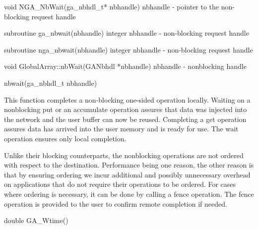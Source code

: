 \documentclass[12pt]{article}
\begin{document}

\begin{capi}
void NGA_NbWait(ga_nbhdl_t* nbhandle)
   nbhandle           - pointer to the non-blocking request handle         \access{[input]} 
\end{capi}

\begin{fapi}
subroutine ga_nbwait(nbhandle)
   integer nbhandle   - non-blocking request handle                        \access{[input]} 
\end{fapi}

\begin{fapi}
subroutine nga_nbwait(nbhandle)
   integer nbhandle   - non-blocking request handle                        \access{[input]} 
\end{fapi}

\begin{cxxapi}
void GlobalArray::nbWait(GANbhdl *nbhandle)
   nbhandle           - nonblocking handle                                 \access{[input]}
\end{cxxapi}

\begin{pyapi}
nbwait(ga_nbhdl_t nbhandle) 
\end{pyapi} 


\begin{desc}

This function completes a non-blocking one-sided operation locally. Waiting on a nonblocking put or an accumulate operation assures that data was injected into the network and the user buffer can now be reused. Completing a get operation assures data has arrived into the user memory and is ready for use. The wait operation ensures only local completion. 

Unlike their blocking counterparts, the nonblocking operations are not ordered with respect to the destination. Performance being one reason, the other reason is that by ensuring ordering we incur additional and possibly unnecessary overhead on applications that do not require their operations to be ordered. For cases where ordering is necessary, it can be done by calling a fence operation. The fence operation is provided to the user to confirm remote completion if needed.
\end{desc}


\begin{capi}
double GA_Wtime()
\end{capi}
\end{document}
